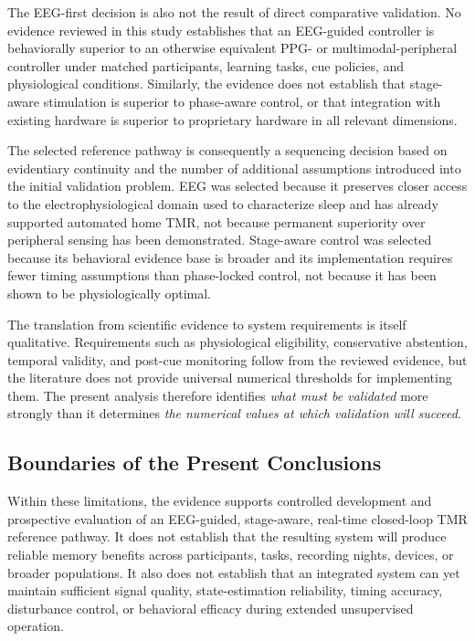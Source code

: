 The EEG-first decision is also not the result of direct comparative
validation. No evidence reviewed in this study establishes that an EEG-guided
controller is behaviorally superior to an otherwise equivalent PPG- or
multimodal-peripheral controller under matched participants, learning tasks,
cue policies, and physiological conditions. Similarly, the evidence does not
establish that stage-aware stimulation is superior to phase-aware control, or
that integration with existing hardware is superior to proprietary hardware in
all relevant dimensions.

The selected reference pathway is consequently a sequencing decision based on
evidentiary continuity and the number of additional assumptions introduced into
the initial validation problem. EEG was selected because it preserves closer
access to the electrophysiological domain used to characterize sleep and has
already supported automated home TMR, not because permanent superiority over
peripheral sensing has been demonstrated. Stage-aware control was selected
because its behavioral evidence base is broader and its implementation requires
fewer timing assumptions than phase-locked control, not because it has been
shown to be physiologically optimal.

The translation from scientific evidence to system requirements is itself
qualitative. Requirements such as physiological eligibility, conservative
abstention, temporal validity, and post-cue monitoring follow from the reviewed
evidence, but the literature does not provide universal numerical thresholds
for implementing them. The present analysis therefore identifies
\textit{what must be validated} more strongly than it determines
\textit{the numerical values at which validation will succeed}.


\subsection{Boundaries of the Present Conclusions}

Within these limitations, the evidence supports controlled development and
prospective evaluation of an EEG-guided, stage-aware, real-time closed-loop TMR
reference pathway. It does not establish that the resulting system will produce
reliable memory benefits across participants, tasks, recording nights, devices,
or broader populations. It also does not establish that an integrated system
can yet maintain sufficient signal quality, state-estimation reliability,
timing accuracy, disturbance control, or behavioral efficacy during extended
unsupervised operation.

